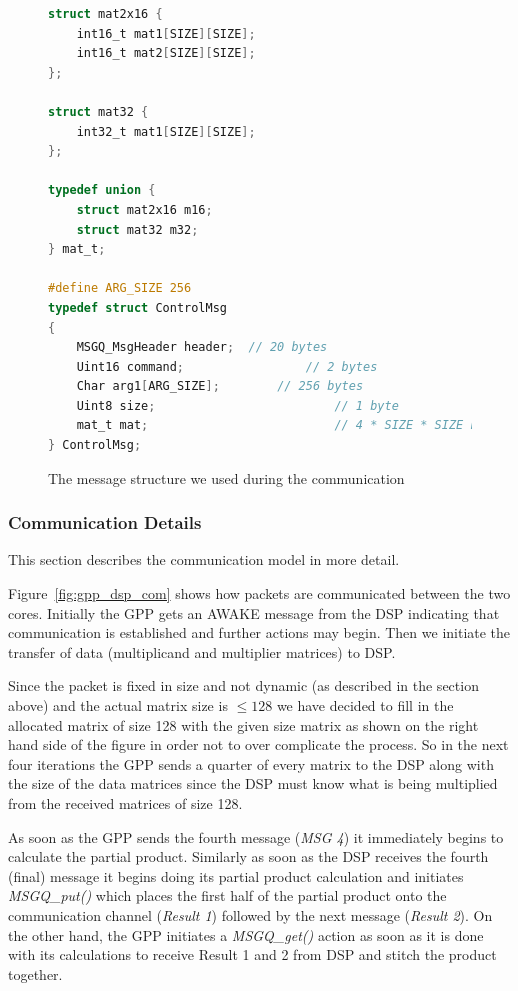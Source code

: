 \begin{figure}[h]
\begin{lstlisting}[language=C]
struct mat2x16 {
	int16_t mat1[SIZE][SIZE];
	int16_t mat2[SIZE][SIZE];
};

struct mat32 {
	int32_t mat1[SIZE][SIZE];
};

typedef union {
	struct mat2x16 m16;
	struct mat32 m32;
} mat_t;

#define ARG_SIZE 256
typedef struct ControlMsg
{
    MSGQ_MsgHeader header;	// 20 bytes
    Uint16 command;					// 2 bytes
    Char arg1[ARG_SIZE];		// 256 bytes
    Uint8 size;							// 1 byte
    mat_t mat;							// 4 * SIZE * SIZE bytes
} ControlMsg;
\end{lstlisting}
\caption{The message structure we used during the communication}
\label{code:control_msg}
\end{figure}


\subsubsection{Communication Details}
This section describes the communication model in more detail.

Figure~\ref{fig:gpp_dsp_com} shows how packets are communicated between the two cores. Initially the GPP gets an AWAKE message from the DSP indicating that communication is established and further actions may begin.
Then we initiate the transfer of data (multiplicand and multiplier matrices) to DSP. 

Since the packet is fixed in size and not dynamic (as described in the section above) and the actual matrix size is $\leq 128$ we have decided to fill in the allocated matrix of size 128 with the given size matrix as shown on the right hand side of the figure in order not to over complicate the process.
So in the next four iterations the GPP sends a quarter of every matrix to the DSP along with the size of the data matrices since the DSP must know what is being multiplied from the received matrices of size 128. 

As soon as the GPP sends the fourth message (\emph{MSG 4}) it immediately begins to calculate the partial product. Similarly as soon as the DSP receives the fourth (final) message it begins doing its partial product calculation and initiates \emph{MSGQ\_put()} which places the first half of the partial product onto the communication channel (\emph{Result 1}) followed by the next message (\emph{Result 2}). On the other hand, the GPP initiates a \emph{MSGQ\_get()} action as soon as it is done with its calculations to receive Result 1 and 2 from DSP and stitch the product together.

